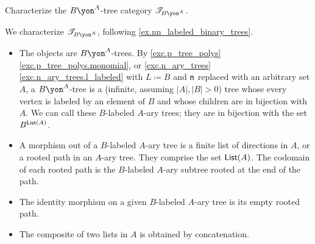 \documentclass[Book-Poly]{subfiles}
\begin{document}
\begin{exercise}
Characterize the $B\yon^A$-tree category $\cofree{B\yon^A}$.
\begin{solution}
We characterize $\cofree{B\yon^A}$, following \cref{ex.nn_labeled_binary_trees}.
\begin{itemize}
    \item The objects are $B\yon^A$-trees.
    By \cref{exc.p_tree_polys} \cref{exc.p_tree_polys.monomial}, or \cref{exc.n_ary_trees} \cref{exc.n_ary_trees.l_labeled} with $L\coloneqq B$ and $\mathsf{n}$ replaced with an arbitrary set $A$, a $B\yon^A$-tree is a (infinite, assuming $|A|,|B|>0$) tree whose every vertex is labeled by an element of $B$ and whose children are in bijection with $A$.
    We can call these $B$-labeled $A$-ary trees; they are in bijection with the set $B^{\mathsf{List}(A)}$.
    \item A morphism out of a $B$-labeled $A$-ary tree is a finite list of directions in $A$, or a rooted path in an $A$-ary tree.
    They comprise the set $\mathsf{List}(A)$.
    The codomain of each rooted path is the $B$-labeled $A$-ary subtree rooted at the end of the path.
    \item The identity morphism on a given $B$-labeled $A$-ary tree is its empty rooted path.
    \item The composite of two lists in $A$ is obtained by concatenation.
\end{itemize}
\end{solution}
\end{exercise}
\end{document}
